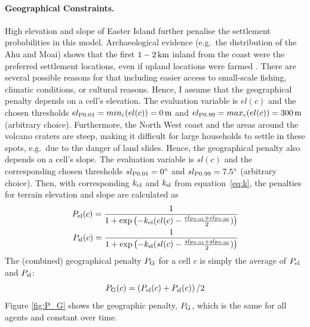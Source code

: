 \paragraph{Geographical Constraints.}%
High elevation and slope of Easter Island further penalise the settlement probabilities in this model.
Archaeological evidence (e.g.\ the distribution of the Ahu and Moai) shows that the first $1-2\, \rm{km}$ inland from the coast were the preferred settlement locations, even if upland locations were farmed \citep{Bahn2017}.
There are several possible reasons for that including easier access to small-scale fishing, climatic conditions, or cultural reasons.
Hence, I assume that the geographical penalty depends on a cell's elevation.
The evaluation variable is $el(c)$ and the chosen thresholds $el_{\rm P0.01}=min_{\rm c}(el(c))=0\, {\rm m}$ and $el_{\rm P0.99}=max_{\rm c}(el(c)) = 300\, {\rm m}$ (arbitrary choice).
Furthermore, the North West coast and the areas around the volcano craters are steep, making it difficult for large households to settle in these spots, e.g.\ due to the danger of land slides. 
Hence, the geographical penalty also depends on a cell's slope.
The evaluation variable is $sl(c)$ and the corresponding chosen thresholds $sl_{\rm P0.01}=0^\circ$ and $sl_{\rm P0.99}=7.5^\circ$ (arbitrary choice). 
Then, with corresponding $k_{\rm el}$ and $k_{\rm sl}$ from equation~\ref{eq:k}, the penalties for terrain elevation and slope are calculated as 
\begin{eqnarray}
	P_{\text{el}}(c) = \frac{1}{1+\exp\left( - k_{\rm el} (el(c)-\frac{el_{\rm P0.01}+el_{\rm P0.99}}{2}) \right)}\\
	P_{\text{sl}}(c) = \frac{1}{1+\exp\left( - k_{\rm sl} (sl(c)-\frac{sl_{\rm P0.01}+sl_{\rm P0.99}}{2}) \right)}
\end{eqnarray}
The (combined) geographical penalty $P_{\rm G}$ for a cell $c$ is simply the average of $P_{\rm el}$ and $P_{\rm sl}$:
\begin{equation}
P_{\rm G}(c) = \left(P_\text{el}(c)+P_\text{sl}(c) \right)/2
\end{equation}
Figure \ref{fig:P_G} shows the geographic penalty, $P_{\rm G}$, which is the same for all agents and constant over time.
